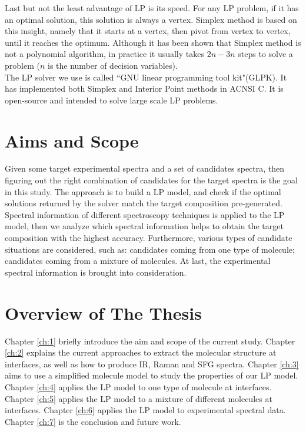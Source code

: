 Last but not the least advantage of LP is its speed. For any LP problem, if it has an optimal solution, this solution is always a vertex. Simplex method is based on this insight, namely that it starts at a vertex, then pivot from vertex to vertex, until it reaches the optimum. Although it has been shown that Simplex method is not a polynomial algorithm, in practice it usually takes $2n-3n$ steps to solve a problem ($n$ is the number of decision variables). \\

The LP solver we use is called ``GNU linear programming tool kit"(GLPK). It has implemented both Simplex and Interior Point methods in ACNSI C. It is open-source and intended to solve large scale LP problems. \\
	
\section{Aims and Scope}
Given some target experimental spectra and a set of candidates spectra, then figuring out the right combination of candidates for the target spectra is the goal in this study. The approach is to build a LP model, and check if the optimal solutions returned by the solver match the target composition pre-generated. Spectral information of different spectroscopy techniques is applied to the LP model, then we analyze which spectral information helps to obtain the target composition with the highest accuracy. Furthermore, various types of candidate situations are considered, such as: candidates coming from one type of molecule; candidates coming from a mixture of molecules. At last, the experimental spectral information is brought into consideration. 

\section{Overview of The Thesis}
Chapter \ref{ch:1} briefly introduce the aim and scope of the current study. Chapter \ref{ch:2} explains the current approaches to extract the molecular structure at interfaces, as well as how to produce IR, Raman and SFG spectra. Chapter \ref{ch:3} aims to use a simplified molecule model to study the properties of our LP model. Chapter \ref{ch:4} applies the LP model to one type of molecule at interfaces. Chapter \ref{ch:5} applies the LP model to a mixture of different molecules at interfaces. Chapter \ref{ch:6} applies the LP model to experimental spectral data. Chapter \ref{ch:7} is the conclusion and future work.
